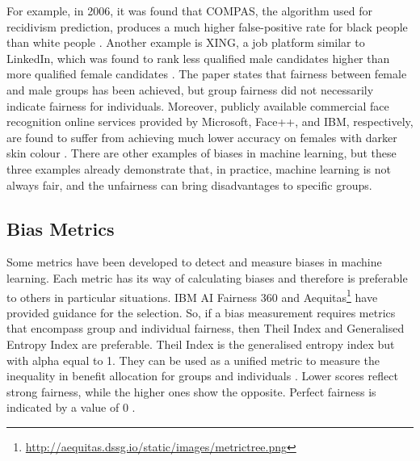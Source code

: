 \documentclass[sigconf,review]{acmart}
\begin{document}
	For example, in 2006, it was found that COMPAS, the algorithm used for recidivism prediction, produces a much higher false-positive rate for black people than white people \cite{angwin2016machine}. Another example is XING, a job platform similar to LinkedIn, which was found to rank less qualified male candidates higher than more qualified female candidates \cite{lahoti2019ifair}. The paper states that fairness between female and male groups has been achieved, but group fairness did not necessarily indicate fairness for individuals. Moreover, publicly available commercial face recognition online services provided by Microsoft, Face++, and IBM, respectively, are found to suffer from achieving much lower accuracy on females with darker skin colour \cite{buolamwini2018gender}. There are other examples of biases in machine learning, but these three examples already demonstrate that, in practice, machine learning is not always fair, and the unfairness can bring disadvantages to specific groups. 
	
	
	\subsection{Bias Metrics}
	\label{sec:bias_metrics}
	
	
	Some metrics have been developed to detect and measure biases in machine learning. Each metric has its way of calculating biases and therefore is preferable to others in particular situations. IBM AI Fairness 360 \cite{mahoney2020ai,ibmaif3602022guidance} and Aequitas\footnote{\url{http://aequitas.dssg.io/static/images/metrictree.png}} have provided guidance for the selection. So, if a bias measurement requires metrics that encompass group and individual fairness, then Theil Index \cite{conceicao2000theyoung,bellamy2018ai} and Generalised Entropy Index \cite{speicher2018unified} are preferable. Theil Index is the generalised entropy index but with alpha equal to 1. They can be used as a unified metric to measure the inequality in benefit allocation for groups and individuals \cite{ibmaif3602022guidance,mahoney2020ai}. Lower scores reflect strong fairness, while the higher ones show the opposite. Perfect fairness is indicated by a value of 0 \cite{lale2022doc}. 
	
\end{document}
